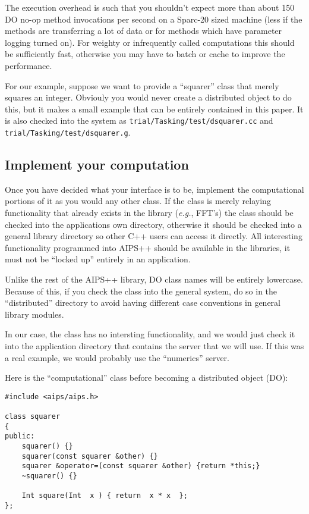 The execution overhead is such that you shouldn't expect more than
about 150 DO no-op method invocations per second on a Sparc-20 sized
machine (less if the methods are transferring a lot of data or for
methods which have parameter logging turned on). For weighty or
infrequently called computations this should be sufficiently fast,
otherwise you may have to batch or cache to improve the performance.

For our example, suppose we want to provide a ``squarer'' class that
merely squares an integer. Obviouly you would never create a
distributed object to do this, but it makes a small example that can
be entirely contained in this paper. It is also checked into the
system as {\tt trial/Tasking/test/dsquarer.cc} and {\tt
trial/Tasking/test/dsquarer.g}.

\subsection{Implement your computation}

Once you have decided what your interface is to be, implement the
computational portions of it as you would any other class. If the class
is merely relaying functionality that already exists in the library
({\em e.g.}, FFT's) the class should be checked into the applications own
directory, otherwise it should be checked into a general library
directory so other C++ users can access it directly. All interesting
functionality programmed into AIPS++ should be available in the
libraries, it must not be ``locked up'' entirely in an application.

Unlike the rest of the AIPS++ library, DO class names will be entirely
lowercase. Because of this, if you check the class into the general
system, do so in the ``distributed'' directory to avoid having
different case conventions in general library modules.

In our case, the class has no intersting functionality, and we would
just check it into the application directory that contains the server
that we will use. If this was a real example, we would probably use
the ``numerics'' server.

Here is the ``computational'' class before becoming a distributed object
(DO):

\begin{verbatim}
#include <aips/aips.h>

class squarer
{
public:
    squarer() {}
    squarer(const squarer &other) {}
    squarer &operator=(const squarer &other) {return *this;}
    ~squarer() {}

    Int square(Int  x ) { return  x * x  };
};
\end{verbatim}

